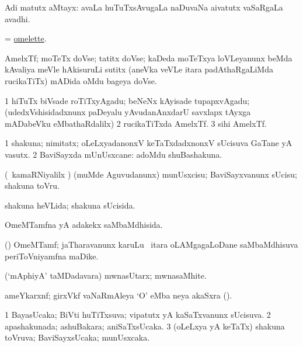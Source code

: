 \noindent
\gl{\pagu}
\bmng
{} Adi matutx aMtayx:  avaLa huTuTxsAvugaLa naDuvaNa aivatutx vaSaRgaLa avadhi. 
\emng
\eentry

\bentry
{}
\gl{\nA}
\bmng
= \hyperlink{omelette}{omelette}. 
\emng
\eentry

\bentry
{}
\gl{\nA}
\bmng
AmelxTf; moTeTx doVse; tatitx doVse; kaDeda moTeTxya loVLeyanunx beMda kAvaliya meVle hAkisuruLi sutitx (aneVka veVLe itara padAthaRgaLiMda rucikaTiTx) mADida oMdu bageya doVse. 
\emng

\noindent
\gl{\pagu}
\bmng
\bnum
\num{1}  hiTuTx biVsade roTiTxyAgadu; beNeNx kAyisade tupapxvAgadu; (udedxVshisidadxnunx paDeyalu yAvudanAnxdarU savxlapx tAyxga mADabeVku eMbathaRdalilx) 
\num{2}  rucikaTiTxda AmelxTf. 
\num{3}  sihi AmelxTf. 
\enum
\emng
\eentry

\bentry
{}
\gl{\nA}
\bmng
\bnum
\num{1} shakuna; nimitatx; oLeLxyadanonxV keTaTxdadxnonxV sUcisuva GaTane yA vasutx. 
\num{2} BaviSayxda mUnUsxcane:  adoMdu shuBashakuna. 
\enum
\emng
\eentry

\bentry
{}
\gl{\sakirx}
\bmng
(\sA\ kamaRNiyalilx \parx) (muMde Aguvudanunx) munUsxcisu; BaviSayxvanunx sUcisu; shakuna toVru. 
\emng
\eentry

\bentry
{}
\gl{\gu}
\bmng
shakuna heVLida; shakuna sUcisida. 
\emng
\eentry

\bentry
{}
\gl{\gu}
\bmng
OmeMTamfna yA adakekx saMbaMdhisida. 
\emng
\eentry

\bentry
{}
\gl{\nA}
\bmng
(\aMrashA) OmeMTamf; jaTharavanunx karuLu \mo\ itara oLAMgagaLoDane saMbaMdhisuva periToVniyamfna maDike. 
\emng
\eentry

\bentry
{}
\gl{\nA}
\bmng
\It (`mAphiyA' taMDadavara) mwnasUtarx; mwnasaMhite. 
\emng
\eentry

\bentry
{}
\gl{\nA}
\bmng
ameYkarxnf; girxVkf vaNaRmAleya `O' eMba neya akaSxra (). 
\emng
\eentry

\bentry
{}
\gl{\gu}
\bmng
\bnum
\num{1} BayasUcaka; BiVti huTiTxsuva; vipatutx yA kaSaTxvanunx sUcisuva. 
\num{2} apashakunada; ashuBakara; aniSaTxsUcaka. 
\num{3} (oLeLxya yA keTaTx) shakuna toVruva; BaviSayxsUcaka; munUsxcaka. 
\enum
\emng
\eentry

